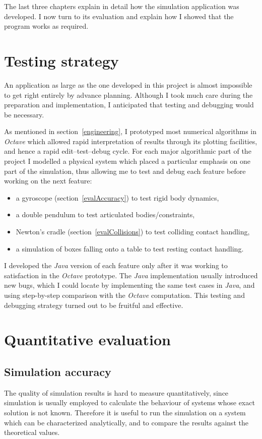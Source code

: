 The last three chapters explain in detail how the simulation application was developed. I now
turn to its evaluation and explain how I showed that the program works as required.

\section{Testing strategy}

An application as large as the one developed in this project is almost impossible to get right
entirely by advance planning. Although I took much care during the preparation and implementation,
I anticipated that testing and debugging would be necessary.

As mentioned in section~\ref{engineering}, I prototyped most numerical algorithms in
\textsl{Octave} which allowed rapid interpretation of results through its plotting facilities,
and hence a rapid edit--test--debug cycle. For each major algorithmic part of the project
I modelled a physical system which placed a particular emphasis on one part of the simulation,
thus allowing me to test and debug each feature before working on the next feature:
\begin{itemize}
\item a gyroscope (section~\ref{evalAccuracy}) to test rigid body dynamics,
\item a double pendulum to test articulated bodies/constraints,
\item Newton's cradle (section~\ref{evalCollisions}) to test colliding contact handling,
\item a simulation of boxes falling onto a table to test resting contact handling.
\end{itemize}

I developed the \textsl{Java} version of each feature only after it was working to satisfaction in
the \textsl{Octave} prototype. The \textsl{Java} implementation usually introduced new bugs, which
I could locate by implementing the same test cases in \textsl{Java}, and using step-by-step
comparison with the \textsl{Octave} computation. This testing and debugging strategy turned out
to be fruitful and effective.


\section{Quantitative evaluation}
\subsection{Simulation accuracy\label{evalAccuracy}}
The quality of simulation results is hard to measure quantitatively, since simulation is usually
employed to calculate the behaviour of systems whose exact solution is not known. Therefore it is
useful to run the simulation on a system which can be characterized analytically, and to compare
the results against the theoretical values.

